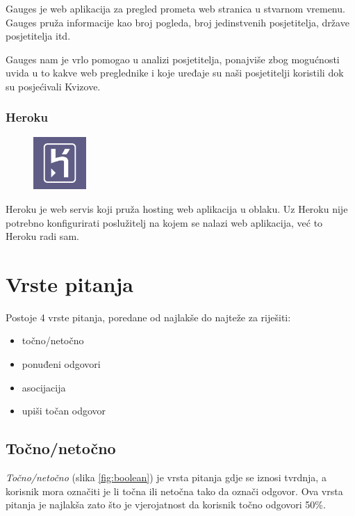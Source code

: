 \documentclass[11pt]{scrreprt}
\begin{document}
Gauges je web aplikacija za pregled prometa web stranica u stvarnom vremenu.
Gauges pruža informacije kao broj pogleda, broj jedinstvenih posjetitelja,
države posjetitelja itd.\cite{gauges}

Gauges nam je vrlo pomogao u analizi posjetitelja, ponajviše zbog mogućnosti
uvida u to kakve web preglednike i koje uređaje su naši posjetitelji koristili
dok su posjećivali Kvizove.

\subsubsection{Heroku}

\begin{figure}
  \vspace{-10pt}
  \includegraphics[width=2cm]{logos/heroku}
  \vspace{-30pt}
\end{figure}

Heroku je web servis koji pruža hosting web aplikacija u oblaku.\cite{heroku}
Uz Heroku nije potrebno konfigurirati poslužitelj na kojem se nalazi web
aplikacija, već to Heroku radi sam.

\section{Vrste pitanja}

Postoje 4 vrste pitanja, poredane od najlakše do najteže za riješiti:

\begin{itemize}
  \item točno/netočno
  \item ponuđeni odgovori
  \item asocijacija
  \item upiši točan odgovor
\end{itemize}

\subsection{Točno/netočno}

\emph{Točno/netočno} (slika \ref{fig:boolean}) je vrsta pitanja gdje se iznosi
tvrdnja, a korisnik mora označiti je li točna ili netočna tako da označi
odgovor. Ova vrsta pitanja je najlakša zato što je vjerojatnost da korisnik
točno odgovori 50\%.
\end{document}
